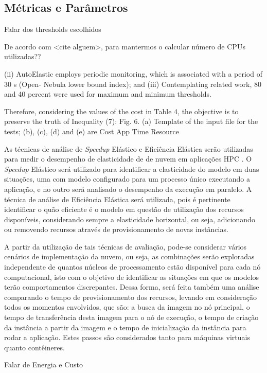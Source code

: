 \documentclass[twoside,english,brazilian]{UNISINOSartigo}
\begin{document}
\subsection{Métricas e Parâmetros}
Falar dos thresholds escolhidos

De acordo com <cite alguem>, para mantermos o 
calcular número de CPUs utilizadas??


(ii) AutoElastic employs periodic
monitoring, which is associated with a period of 30 s (Open-
Nebula lower bound index); and (iii) Contemplating related
work, 80 and 40 percent were used for maximum and minimum
thresholds.


Therefore, considering the values of the cost in
Table 4, the objective is to preserve the truth of
Inequality (7):
Fig. 6. (a) Template of the input file for the tests; (b), (c), (d) and (e) are Cost App Time Resource



As técnicas de análise de \textit{Speedup} Elástico e Eficiência Elástica serão utilizadas para medir o desempenho de elasticidade de de nuvem em aplicações HPC \cite{Facco2016}. O \textit{Speedup} Elástico será utilizado para identificar a elasticidade do modelo em duas situações, uma com modelo configurado para um processo único executando a aplicação, e no outro será analisado o desempenho da execução em paralelo. A técnica de análise de Eficiência Elástica será utilizada, pois é pertinente identificar o quão eficiente é o modelo em questão de utilização dos recursos disponíveis, considerando sempre a elasticidade horizontal, ou seja, adicionando ou removendo recursos através de provisionamento de novas instâncias. 

A partir da utilização de tais técnicas de avaliação, pode-se considerar vários cenários de implementação da nuvem, ou seja, as combinações serão exploradas independente de quantos núcleos de processamento estão disponível para cada nó computacional, isto com o objetivo de identificar as situações em que os modelos terão comportamentos discrepantes. Dessa forma, será feita também uma análise comparando o tempo de provisionamento dos recursos, levando em consideração todos os momentos envolvidos, que são: a busca da imagem no nó principal, o tempo de transferência desta imagem para o nó de execução, o tempo de criação da instância a partir da imagem e o tempo de inicialização da instância para rodar a aplicação. Estes passos são considerados tanto para máquinas virtuais quanto contêineres. 

Falar de Energia e Custo
\end{document}
